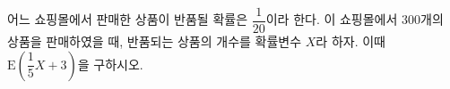 어느 쇼핑몰에서 판매한 상품이 반품될 확률은 $\dfrac{1}{20}$이라 한다. 이 쇼핑몰에서 300개의 상품을 판매하였을 때, 반품되는 상품의 개수를 확률변수 $X$라 하자. 이때 $\mathrm{E}\left(\dfrac{1}{5}X+3\right)$을 구하시오. 
